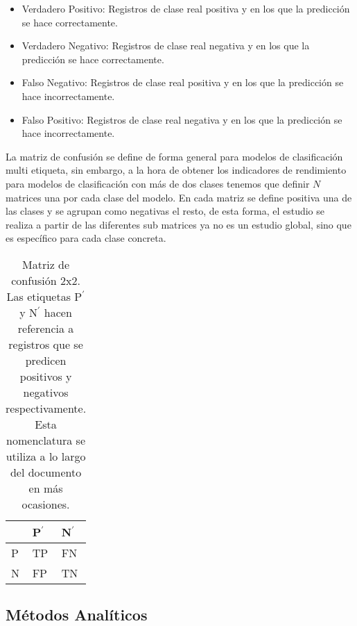 \begin{itemize}
    \item Verdadero Positivo: Registros de clase real positiva y en los que la predicción se hace correctamente.
    \item Verdadero Negativo: Registros de clase real negativa y en los que la predicción se hace correctamente.
    \item Falso Negativo: Registros de clase real positiva y en los que la predicción se hace incorrectamente.
    \item Falso Positivo: Registros de clase real negativa y en los que la predicción se hace incorrectamente.
\end{itemize}

La matriz de confusión se define de forma general para modelos de clasificación multi etiqueta, sin embargo, a la hora de obtener los indicadores de rendimiento para modelos de clasificación con más de dos clases tenemos que definir $N$ matrices una por cada clase del modelo. En cada matriz se define positiva una de las clases y se agrupan como negativas el resto, de esta forma, el estudio se realiza a partir de las diferentes sub matrices ya no es un estudio global, sino que es específico para cada clase concreta.

\begin{table}[htp]
    \small
    \centering
    \begin{tabularx}{150pt}{Y Y Y}
            & P$^{\prime}$  & N$^{\prime}$    \\\hline
        P   & TP            & FN              \\\hline
        N   & FP            & TN              \\\hline
    \end{tabularx}

    \caption{Matriz de confusión 2x2. Las etiquetas P$^{\prime}$ y N$^{\prime}$ hacen referencia a registros que se predicen positivos y negativos respectivamente. Esta nomenclatura se utiliza a lo largo del documento en más ocasiones.}
    \label{tab:1}
\end{table}


\subsection{Métodos Analíticos}


